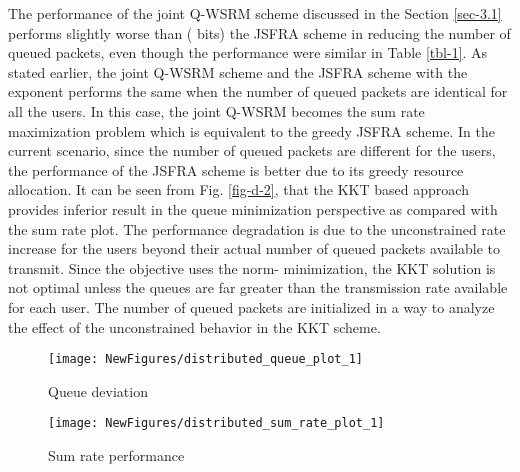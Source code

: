 The performance of the joint \ac{Q-WSRM} scheme discussed in the Section \ref{sec-3.1} performs slightly worse than ( bits) the \ac{JSFRA} scheme in reducing the number of queued packets, even though the performance were similar in Table \ref{tbl-1}. As stated earlier, the joint \ac{Q-WSRM} scheme and the \ac{JSFRA} scheme with the exponent  performs the same when the number of queued packets are identical for all the users. In this case, the joint \ac{Q-WSRM} becomes the sum rate maximization problem which is equivalent to the greedy  \ac{JSFRA} scheme. In the current scenario, since the number of queued packets are different for the users, the performance of the \ac{JSFRA} scheme is better due to its greedy resource allocation. It can be seen from Fig. \ref{fig-d-2}, that the \ac{KKT} based approach provides inferior result in the queue minimization perspective as compared with the sum rate plot. The performance degradation is due to the unconstrained rate increase for the users beyond their actual number of queued packets available to transmit. Since the objective uses the norm- minimization, the \ac{KKT} solution is not optimal unless the queues are far greater than the transmission rate available for each user. The number of queued packets are initialized in a way to analyze the effect of the unconstrained behavior in the \ac{KKT} scheme.
\begin{figure*}
\centering
\begin{subfigure}{0.49\textwidth}
\texttt{[image: NewFigures/distributed\_queue\_plot\_1]}
\caption{Queue deviation}
\end{subfigure}
\hfill
\begin{subfigure}{0.49\textwidth}
\texttt{[image: NewFigures/distributed\_sum\_rate\_plot\_1]}
\caption{Sum rate performance}
\end{subfigure}
\caption{Convergence plot for  model}
\label{fig-d-2}
\end{figure*}

